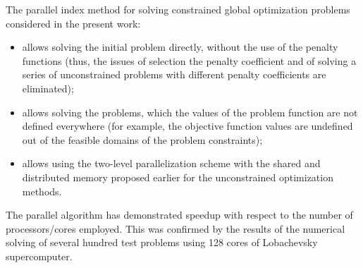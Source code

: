 \documentclass[smallextended]{svjour3}       %
\begin{document}
The parallel index method for solving constrained global optimization problems considered in the present work:
\begin{itemize}
	\item allows solving the initial problem directly, without the use of the penalty functions (thus, the issues of selection the penalty coefficient and of solving a series of unconstrained problems with different penalty coefficients are eliminated);
	\item allows solving the problems, which the values of the problem function are not defined everywhere (for example, the objective function values are undefined out of the feasible domains of the problem constraints);
	\item allows using the two-level parallelization scheme with the shared and distributed memory proposed earlier for the unconstrained optimization methods.
\end{itemize}

The parallel algorithm has demonstrated speedup with respect to the number of processors/cores employed. This was confirmed by the results of the numerical solving of several hundred test problems using 128 cores of Lobachevsky supercomputer. 
\end{document}

